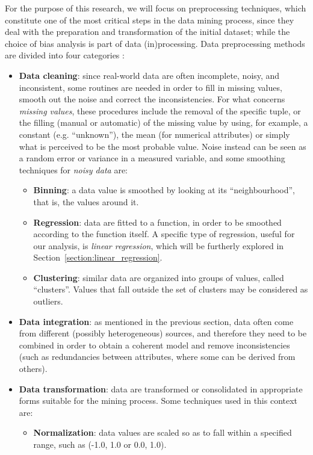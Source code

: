 For the purpose of this research, we will focus on preprocessing techniques, which constitute one of the most critical steps in the data mining process, since they deal with the preparation and transformation of the initial dataset; while the choice of bias analysis is part of data (in)processing. Data preprocessing methods are divided into four categories \cite{tamilselvi2015efficient}:
\begin{itemize}
\item \textbf{Data cleaning}: since real-world data are often incomplete, noisy, and inconsistent, some routines are needed in order to fill in missing values, smooth out the noise and correct the inconsistencies.
For what concerns \textit{missing values}, these procedures include the removal of the specific tuple, or the filling (manual or automatic) of the missing value by using, for example, a constant (e.g. ``unknown''), the mean (for numerical attributes) or simply what is perceived to be the most probable value.
Noise instead can be seen as a random error or variance in a measured variable, and some smoothing techniques for \textit{noisy data} are:
\begin{itemize}
\item \textbf{Binning}: a data value is smoothed by looking at its ``neighbourhood'', that is, the values around it.
\item \textbf{Regression}: data are fitted to a function, in order to be smoothed according to the function itself. A specific type of regression, useful for our analysis, is \textit{linear regression}, which will be furtherly explored in Section~\ref{section:linear_regression}.
\item \textbf{Clustering}: similar data are organized into groups of values, called ``clusters''. Values that fall outside the set of clusters may be considered as outliers.
\end{itemize}
\item \textbf{Data integration}: as mentioned in the previous section, data often come from different (possibly heterogeneous) sources, and therefore they need to be combined in order to obtain a coherent model and remove inconsistencies (such as redundancies between attributes, where some can be derived from others).
\item \textbf{Data transformation}: data are transformed or consolidated in appropriate forms suitable for the mining process. Some techniques used in this context are:
\begin{itemize}
\item \textbf{Normalization}: data values are scaled so as to fall within a specified range, such as (-1.0, 1.0 or 0.0, 1.0).

\end{itemize}
\end{itemize}
